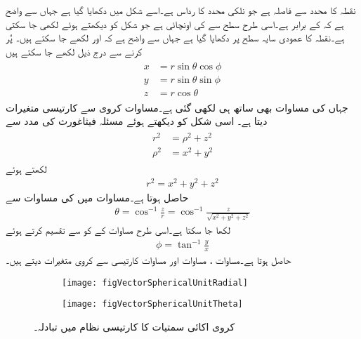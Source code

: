 نقطہ  کا  محدد سے فاصلہ   ہے جو نلکی محدد کا رداس ہے۔اسے شکل  میں دکھایا گیا ہے جہاں سے واضح ہے کہ  کے برابر ہے۔اسی طرح  سطح سے  کی اونچائی  ہے جو شکل کو دیکھتے ہوئے   لکھی جا سکتی ہے۔نقطہ  کا عمودی سایہ  سطح پر دکھایا گیا ہے جہاں سے واضح ہے کہ  اور  لکھے جا سکتے ہیں۔ پُر کرنے سے درج ذیل لکھے جا سکتے ہیں
\begin{gather}
\begin{aligned}\label{مساوات_سمتیہ_کروی_سے_کارتیسی}
x&=r \sin \theta \cos \phi\\
y&=r \sin \theta \sin \phi\\
z&=r \cos \theta
\end{aligned}
\end{gather}
جہاں  کی مساوات بھی ساتھ ہی لکھی  گئی ہے۔مساوات  کروی سے کارتیسی متغیرات دیتا ہے۔ اسی شکل کو دیکھتے ہوئے مسئلہ فیثاغورث کی مدد سے 
\begin{gather}
\begin{aligned}
r^2&=\rho^2+z^2\\
\rho^2&=x^2+y^2
\end{aligned}
\end{gather}
لکھتے ہوئے
\begin{align}\label{مساوات_سمتیہ_کروی_رداس}
r^2=x^2+y^2+z^2
\end{align}
حاصل ہوتا ہے۔مساوات  میں  کی مساوات سے
\begin{align}\label{مساوات_سمتیہ_کروی_تھیٹا}
\theta = \cos^{-1} \frac{z}{r}=\cos^{-1}\frac{z}{\sqrt{x^2+y^2+z^2}}
\end{align}
 لکھا جا سکتا ہے۔اسی طرح  مساوات  کے  کو  سے تقسیم کرتے ہوئے
\begin{align}\label{مساوات_سمتیہ_کروی_فائے}
\phi = \tan^{-1} \frac{y}{x}
\end{align}
حاصل ہوتا ہے۔مساوات ، مساوات  اور مساوات  کارتیسی سے کروی متغیرات دیتے ہیں۔
\begin{figure}
\centering
\begin{subfigure}{0.5\textwidth}
\centering
\texttt{[image: figVectorSphericalUnitRadial]}
\end{subfigure}%
%
\begin{subfigure}{0.5\textwidth}
\centering
\texttt{[image: figVectorSphericalUnitTheta]}
\end{subfigure}%
\caption{کروی اکائی سمتیات کا کارتیسی نظام میں تبادلہ۔}
\label{شکل_سمتیہ_کروی_اکائی_رداسی_سمتیہ_کارتیسی}
\end{figure}

